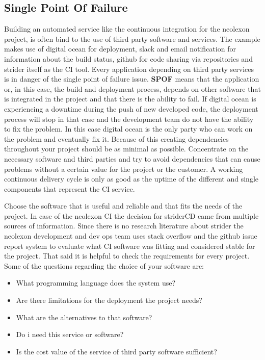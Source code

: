 \subsection{Single Point Of Failure}
\label{section:Single Point Of Failure}
Building an automated service like the continuous integration for the neolexon project, is often bind to the use of third party software and services.
The example makes use of digital ocean for deployment, slack and email notification for information about the build status, github for code sharing
via repositories and strider itself as the CI tool. Every application depending on third party services is in danger of the single point of failure
issue. \textbf{SPOF} means that the application or, in this case, the build and deployment process, depends on other software that is integrated in the
project and that there is the ability to fail. If digital ocean is experiencing a downtime during the push of new developed code, the deployment
process will stop in that case and the development team do not have the ability to fix the problem. In this case digital ocean is the only party
who can work on the problem and eventually fix it. Because of this creating dependencies throughout your project should be as minimal as possible.
Concentrate on the necessary software and third parties and try to avoid dependencies that can cause problems without a certain value for the project
or the customer. A working continuous delivery cycle is only as good as the uptime of the different and single components that represent the CI service.

Choose the software that is useful and reliable and that fits the needs of the project. In case of the neolexon CI the decision for striderCD came from
multiple sources of information. Since there is no research literature about strider the neolexon development and dev ops team uses stack overflow and the
github issue report system to evaluate what CI software was fitting and considered stable for the project. That said it is helpful to check the requirements
for every project. Some of the questions regarding the choice of your software are:

\begin{itemize}
  \item What programming language does the system use?
  \item Are there limitations for the deployment the project needs?
  \item What are the alternatives to that software?
  \item Do i need this service or software?
  \item Is the cost value of the service of third party software sufficient?
\end{itemize} \cite{ulbrich2012eliminating}

